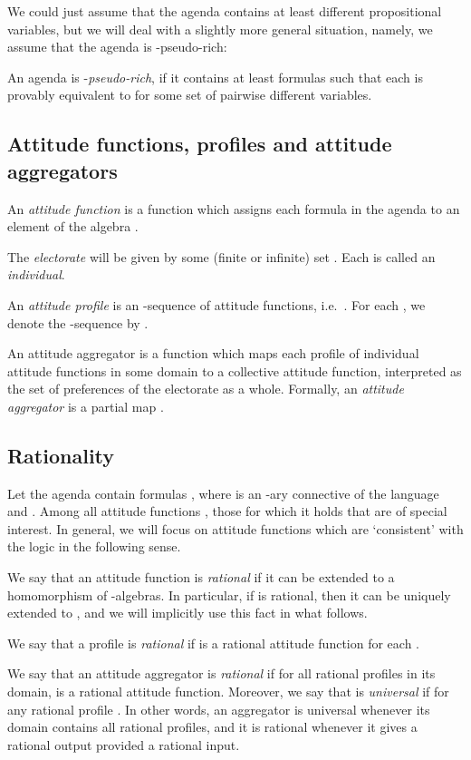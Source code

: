 \documentclass{llncs}
\numberwithin{equation}{section}
\begin{document}
We could just assume that the agenda contains at least  different propositional variables, but we will deal with a slightly more general situation, namely, we assume that the agenda is -pseudo-rich:

\begin{definition}\label{def:pseudo:rich}
An agenda is -\emph{pseudo-rich}, if it contains at least  formulas  such that each  is provably equivalent to  for some set  of pairwise different variables.
\end{definition}

\subsection{Attitude functions, profiles and attitude aggregators}

An \emph{attitude function} is a function  which assigns each formula in the agenda to an element of the algebra .

The \emph{electorate} will be given by some (finite or infinite) set . Each  is called an \emph{individual}.

An \emph{attitude profile} is an -sequence of attitude functions, i.e.\ .
For each , we denote the -sequence  by .

An attitude aggregator is a function which maps each profile of individual attitude functions in some domain to a collective attitude function, interpreted as the set of preferences of the electorate as a whole.
Formally, an \emph{attitude aggregator} is a partial map .

\subsection{Rationality}
Let the agenda contain formulas , where  is an -ary connective of the language and .
Among all attitude functions , those for which it holds that  are of special interest. In general, we will focus on attitude functions which are `consistent' with the logic  in the following sense.

We say that an attitude function  is \emph{rational} if it can be extended to a homomorphism  of -algebras. In particular, if  is rational, then it can be uniquely extended to , and we will implicitly use this fact in what follows.

We say that a profile  is \emph{rational} if  is a rational attitude function for each .

We say that an attitude aggregator  is \emph{rational} if for all rational profiles  in its domain,  is a rational attitude function. Moreover, we say that  is \emph{universal} if  for any rational profile . In other words, an aggregator is universal whenever its domain contains all rational profiles, and it is rational whenever it gives a rational output provided a rational input.
\end{document}
